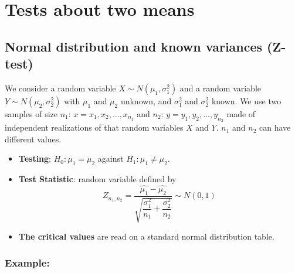 \documentclass[
  letterpaper,
  DIV=11,
  numbers=noendperiod]{scrreprt}
\providecommand{\tightlist}{%
  \setlength{\itemsep}{0pt}\setlength{\parskip}{0pt}}\usepackage{longtable,booktabs,array}
\begin{document}
\section{Tests about two means}\label{tests-about-two-means}

\subsection{Normal distribution and known variances
(Z-test)}\label{normal-distribution-and-known-variances-z-test}

We consider a random variable \(X \sim N(\mu_1, \sigma_1^2)\) and a
random variable \(Y \sim N(\mu_2, \sigma_2^2)\) with \(\mu_1\) and
\(\mu_2\) unknown, and \(\sigma_1^2\) and \(\sigma_2^2\) known. We use
two samples of size \(n_1\): \(x = {x_1, x_2,..., x_{n_1}}\) and
\(n_2\): \(y = {y_1, y_2,..., y_{n_2}}\) made of independent
realizations of that random variables \(X\) and \(Y\). \(n_1\) and
\(n_2\) can have different values.

\begin{itemize}
\tightlist
\item
  \textbf{Testing}: \(H_0: \mu_1 = \mu_2\) against
  \(H_1: \mu_1 \neq \mu_2\).
\item
  \textbf{Test Statistic}: random variable defined by
  \[Z_{n_1, n_2} = \dfrac{\hat{\mu_1} - \hat{\mu_2}}{\sqrt{\dfrac{\sigma^2_1} {n_1} + \dfrac{\sigma^2_2} {n_2}}} \sim N(0, 1)\]
\item
  \textbf{The critical values} are read on a standard normal
  distribution table.
\end{itemize}

\subsubsection{Example:}\label{example-8}
\end{document}
